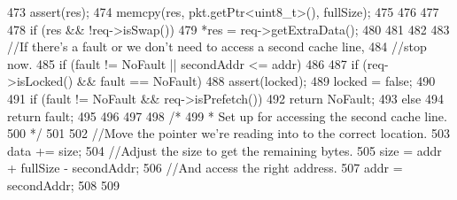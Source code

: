 \begin{DoxyCode}
{{{{{473                     assert(res);
474                     memcpy(res, pkt.getPtr<uint8_t>(), fullSize);
475                 }
476             }
477 
478             if (res && !req->isSwap()) {
479                 *res = req->getExtraData();
480             }
481         }
482 
483         //If there's a fault or we don't need to access a second cache line,
484         //stop now.
485         if (fault != NoFault || secondAddr <= addr)
486         {
487             if (req->isLocked() && fault == NoFault) {
488                 assert(locked);
489                 locked = false;
490             }
491             if (fault != NoFault && req->isPrefetch()) {
492                 return NoFault;
493             } else {
494                 return fault;
495             }
496         }
497 
498         /*
499          * Set up for accessing the second cache line.
500          */
501 
502         //Move the pointer we're reading into to the correct location.
503         data += size;
504         //Adjust the size to get the remaining bytes.
505         size = addr + fullSize - secondAddr;
506         //And access the right address.
507         addr = secondAddr;
508     }
509 }
\end{DoxyCode}


